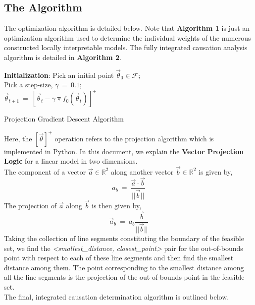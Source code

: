 \documentclass{article}
\begin{document}
\subsection{The Algorithm}
The optimization algorithm is detailed below. Note that \textbf{Algorithm 1} is just an optimization algorithm used to determine the individual weights of the numerous constructed locally interpretable models. The fully integrated causation analysis algorithm is detailed in \textbf{Algorithm 2}.
\begin{algorithm}[H]
\SetAlgoLined
\textbf{Initialization}: Pick an initial point $\vec{\theta}_0 \in \mathcal{F}$;
\\Pick a step-size, $\gamma\ =\ 0.1$;\\
{
    $\vec{\theta}_{t+1}\ =\ [\vec{\theta}_t - \gamma \triangledown f_0(\vec{\theta}_t)]^+$\;
}
\caption{Projection Gradient Descent Algorithm}
\end{algorithm}
Here, the $[\vec{\theta}]^+$ operation refers to the projection algorithm which is implemented in Python. In this document, we explain the \textbf{Vector Projection Logic} for a linear model in two dimensions.
\\The component of a vector $\vec{a} \in \mathbb{R}^2$ along another vector $\vec{b} \in \mathbb{R}^2$ is given by,
\[a_b\ =\ \frac{\vec{a} \cdot \vec{b}}{||\vec{b}||}\]
The projection of $\vec{a}$ along $\vec{b}$ is then given by,
\[\vec{a}_b\ =\ a_b \frac{\vec{b}}{||\vec{b}||}\]
Taking the collection of line segments constituting the boundary of the feasible set, we find the \textit{<smallest\_distance, closest\_point>} pair for the out-of-bounds point with respect to each of these line segments and then find the smallest distance among them. The point corresponding to the smallest distance among all the line segments is the projection of the out-of-bounds point in the feasible set.
\\The final, integrated causation determination algorithm is outlined below.
\newpage
\end{document}
